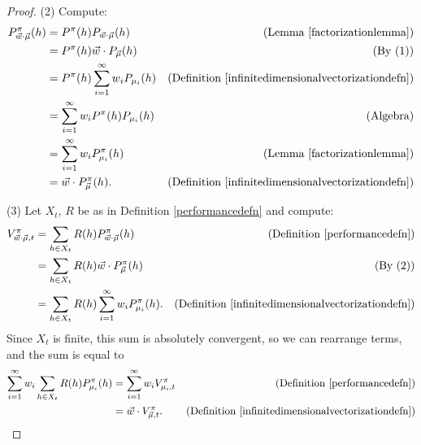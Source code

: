 \documentclass[twoside]{article}
\begin{document}
\begin{proof}
    (2) Compute:
    \begin{align*}
        P^\pi_{\vec w\cdot \vec\mu}(h)
            &= P^\pi(h) P_{\vec w\cdot \vec\mu}(h)
                &\mbox{(Lemma \ref{factorizationlemma})}\\
            &= P^\pi(h) \vec w\cdot P_{\vec\mu}(h)
                &\mbox{(By (1))}\\
            &= P^\pi(h) \sum_{i=1}^\infty w_i P_{\mu_i}(h)
                &\mbox{(Definition \ref{infinitedimensionalvectorizationdefn})}\\
            &= \sum_{i=1}^\infty w_iP^\pi(h)P_{\mu_i}(h)
                &\mbox{(Algebra)}\\
            &= \sum_{i=1}^\infty w_iP^\pi_{\mu_i}(h)
                &\mbox{(Lemma \ref{factorizationlemma})}\\
            &= \vec w\cdot P^\pi_{\vec\mu}(h).
                &\mbox{(Definition \ref{infinitedimensionalvectorizationdefn})}
    \end{align*}

    (3) Let $X_t$, $R$ be as in Definition \ref{performancedefn} and compute:
    \begin{align*}
        V^\pi_{\vec w\cdot\vec\mu,t}
            &= \sum_{h\in X_t}R(h)P^\pi_{\vec w\cdot\vec\mu}(h)
                &\mbox{(Definition \ref{performancedefn})}\\
            &= \sum_{h\in X_t}R(h)\vec w\cdot P^\pi_{\vec\mu}(h)
                &\mbox{(By (2))}\\
            &= \sum_{h\in X_t}R(h)\sum_{i=1}^\infty w_iP^\pi_{\mu_i}(h).
                &\mbox{(Definition \ref{infinitedimensionalvectorizationdefn})}
    \end{align*}
    Since $X_t$ is finite, this sum is absolutely convergent, so we can
    rearrange terms, and the sum is equal to
    \begin{align*}
        \sum_{i=1}^\infty w_i\sum_{h\in X_t}R(h)P^\pi_{\mu_i}(h)
            &= \sum_{i=1}^\infty w_i V^\pi_{\mu_i,t}
                &\mbox{(Definition \ref{performancedefn})}\\
            &= \vec w\cdot V^\pi_{\vec\mu,t}.
                &\mbox{(Definition \ref{infinitedimensionalvectorizationdefn})}
    \end{align*}
\end{proof}
\end{document}
